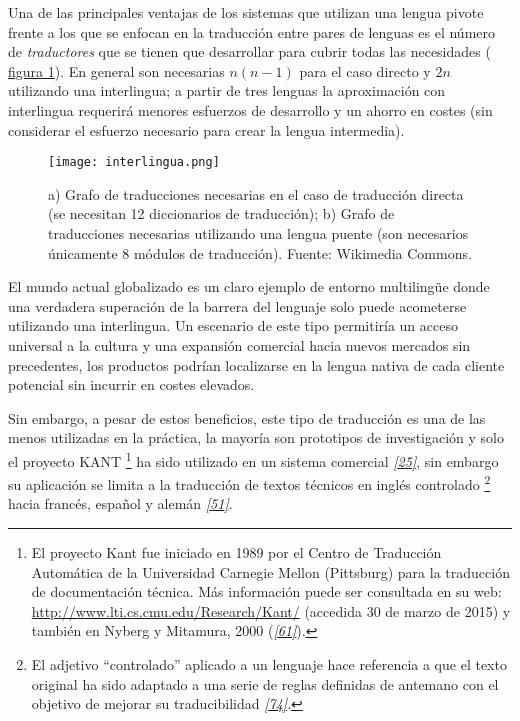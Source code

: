 \documentclass[a4paper,12pt,spanish]{book}
\begin{document}
Una de las principales ventajas de los sistemas que utilizan una lengua pivote frente a
los que se enfocan en la traducción entre pares de lenguas es el número de \emph{traductores}
que se tienen que desarrollar para cubrir todas las necesidades (
\hyperref[0.intro:fig-interlingua]{figura  \ref*{0.intro:fig-interlingua}}). En general son necesarias \(n(n-1)\) para el caso directo
y \(2n\) utilizando una interlingua; a partir de tres lenguas la aproximación con
interlingua requerirá menores esfuerzos de desarrollo y un ahorro en costes (sin
considerar el esfuerzo necesario para crear la lengua intermedia).
\begin{figure}[htbp]
\centering
\capstart

\texttt{[image: interlingua.png]}
\caption[Traducción directa y traducción con lengua intermedia.]{a) Grafo de traducciones necesarias en el caso de traducción directa
(se necesitan 12 diccionarios de traducción); b) Grafo de traducciones necesarias
utilizando una lengua puente (son necesarios únicamente 8 módulos de traducción).
Fuente: Wikimedia Commons.}\label{0.intro:fig-interlingua}\end{figure}

El mundo actual globalizado es un claro ejemplo de entorno multilingüe donde una
verdadera superación de la barrera del lenguaje solo puede acometerse utilizando una
interlingua. Un escenario de este tipo permitiría un acceso universal a la cultura y
una expansión comercial hacia nuevos mercados sin precedentes, los productos podrían
localizarse en la lengua nativa de cada cliente potencial sin incurrir en costes elevados.

Sin embargo, a pesar de estos beneficios, este tipo de traducción es una de las menos
utilizadas en la práctica, la mayoría son prototipos de investigación y solo el
proyecto KANT \footnote{
El proyecto Kant fue iniciado en 1989 por el Centro de Traducción Automática de
la Universidad Carnegie Mellon (Pittsburg) para la traducción de documentación
técnica. Más información puede ser consultada en su web:
\href{http://www.lti.cs.cmu.edu/Research/Kant/}{http://www.lti.cs.cmu.edu/Research/Kant/} (accedida 30 de marzo de 2015) y
también en Nyberg y Mitamura, 2000 (\label{0.intro:id31}{\hyperref[zreferences:nyberg2000]{\emph{{[}61{]}}}}).
} ha sido utilizado en un sistema comercial \label{0.intro:id27}{\hyperref[zreferences:brown2006]{\emph{{[}25{]}}}}, sin
embargo su aplicación se limita a la traducción de textos técnicos en inglés
controlado \footnote{
El adjetivo ``controlado'' aplicado a un lenguaje hace referencia a que el texto
original ha sido adaptado a una serie de reglas definidas de antemano con el
objetivo de mejorar su traducibilidad \label{0.intro:id33}{\hyperref[zreferences:schwitter2010]{\emph{{[}74{]}}}}.
} hacia francés, español y alemán \label{0.intro:id29}{\hyperref[zreferences:lonsdale1994]{\emph{{[}51{]}}}}.
\end{document}
